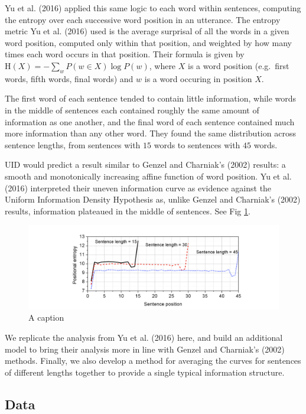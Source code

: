 \documentclass[man,floatsintext]{apa6}
\begin{document}
Yu et al. (2016) applied this same logic to each word within sentences, computing the entropy over each successive word position in an utterance. The entropy metric Yu et al. (2016) used is the average surprisal of all the words in a given word position, computed only within that position, and weighted by how many times each word occurs in that position. Their formula is given by \(\text{H}(X) = -\sum_{w}P(w \in X) \log P(w)\), where \(X\) is a word position (e.g.~first words, fifth words, final words) and \(w\) is a word occuring in position \(X\).

The first word of each sentence tended to contain little information, while words in the middle of sentences each contained roughly the same amount of information as one another, and the final word of each sentence contained much more information than any other word. They found the same distribution across sentence lengths, from sentences with \(15\) words to sentences with \(45\) words.

UID would predict a result similar to Genzel and Charniak's (2002) results: a smooth and monotonically increasing affine function of word position. Yu et al. (2016) interpreted their uneven information curve as evidence against the Uniform Information Density Hypothesis as, unlike Genzel and Charniak's (2002) results, information plateaued in the middle of sentences. See Fig \ref{fig:bnc-yu}.

\begin{figure}[tb]
\includegraphics[width=1\linewidth]{figs/bnc-yu} \caption{A caption}\label{fig:bnc-yu}
\end{figure}

We replicate the analysis from Yu et al. (2016) here, and build an additional model to bring their analysis more in line with Genzel and Charniak's (2002) methods. Finally, we also develop a method for averaging the curves for sentences of different lengths together to provide a single typical information structure.

\hypertarget{data}{%
\subsection{Data}\label{data}}
\end{document}
